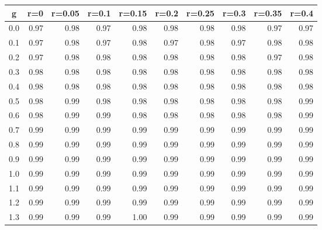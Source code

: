 %
\begin{table}[!tbp]
 \begin{center}
 \begin{tabular}{rrrrrrrrrr}\hline\hline
\multicolumn{1}{c}{g}&\multicolumn{1}{c}{r=0}&\multicolumn{1}{c}{r=0.05}&\multicolumn{1}{c}{r=0.1}&\multicolumn{1}{c}{r=0.15}&\multicolumn{1}{c}{r=0.2}&\multicolumn{1}{c}{r=0.25}&\multicolumn{1}{c}{r=0.3}&\multicolumn{1}{c}{r=0.35}&\multicolumn{1}{c}{r=0.4}\tabularnewline
\hline
0.0&0.97&0.98&0.97&0.98&0.98&0.98&0.98&0.97&0.97\tabularnewline
0.1&0.97&0.98&0.97&0.98&0.97&0.98&0.97&0.98&0.98\tabularnewline
0.2&0.97&0.98&0.98&0.98&0.98&0.98&0.98&0.97&0.98\tabularnewline
0.3&0.98&0.98&0.98&0.98&0.98&0.98&0.98&0.98&0.98\tabularnewline
0.4&0.98&0.98&0.98&0.98&0.98&0.98&0.98&0.98&0.98\tabularnewline
0.5&0.98&0.99&0.98&0.98&0.98&0.98&0.98&0.98&0.99\tabularnewline
0.6&0.98&0.99&0.99&0.98&0.98&0.98&0.98&0.98&0.99\tabularnewline
0.7&0.99&0.99&0.99&0.99&0.99&0.99&0.99&0.99&0.99\tabularnewline
0.8&0.99&0.99&0.99&0.99&0.99&0.99&0.99&0.99&0.99\tabularnewline
0.9&0.99&0.99&0.99&0.99&0.99&0.99&0.99&0.99&0.99\tabularnewline
1.0&0.99&0.99&0.99&0.99&0.99&0.99&0.99&0.99&0.99\tabularnewline
1.1&0.99&0.99&0.99&0.99&0.99&0.99&0.99&0.99&0.99\tabularnewline
1.2&0.99&0.99&0.99&0.99&0.99&0.99&0.99&0.99&0.99\tabularnewline
1.3&0.99&0.99&0.99&1.00&0.99&0.99&0.99&0.99&0.99\tabularnewline
\hline
\end{tabular}

\end{center}

\end{table}

